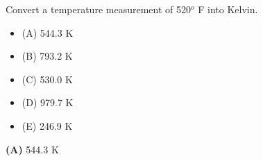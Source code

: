 

Convert a temperature measurement of 520$^{o}$ F into Kelvin.

\begin{itemize}
\item{(A)} 544.3 K
\vskip 5pt 
\item{(B)} 793.2 K
\vskip 5pt 
\item{(C)} 530.0 K
\vskip 5pt 
\item{(D)} 979.7 K
\vskip 5pt 
\item{(E)} 246.9 K
\end{itemize}







{\bf (A)} 544.3 K
 









